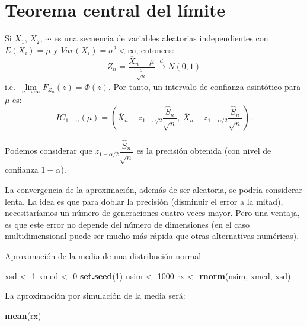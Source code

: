 \documentclass[
]{book}
\newenvironment{Shaded}{\begin{snugshade}}{\end{snugshade}}
\newcommand{\DecValTok}[1]{\textcolor[rgb]{0.00,0.00,0.81}{#1}}
\newcommand{\KeywordTok}[1]{\textcolor[rgb]{0.13,0.29,0.53}{\textbf{#1}}}
\newcommand{\NormalTok}[1]{#1}
\newcommand{\StringTok}[1]{\textcolor[rgb]{0.31,0.60,0.02}{#1}}
\theoremstyle{break}
\theoremstyle{definition}
\theoremstyle{definition}
\theoremstyle{definition}
\theoremstyle{remark}
\let\BeginKnitrBlock\begin \let\EndKnitrBlock\end
\begin{document}
\hypertarget{teorema-central-del-luxedmite}{%
\section{Teorema central del límite}\label{teorema-central-del-luxedmite}}

Si \(X_{1}\), \(X_{2}\), \(\cdots\) es una secuencia de variables aleatorias
independientes con \(E\left( X_{i}\right) =\mu\) y
\(Var\left( X_{i}\right) = \sigma ^{2}<\infty\), entonces:
\[Z_{n}=\frac{\overline{X}_{n}-\mu }{\frac{\sigma }{\sqrt{n}}}
\overset{d}{ \rightarrow } N(0,1)\]
i.e.~\(\lim\limits_{n\rightarrow \infty }F_{Z_{n}}(z)=\Phi (z)\).
Por tanto, un intervalo de confianza asintótico para \(\mu\) es:
\[IC_{1-\alpha }(\mu ) = \left( \overline{X}_{n}
- z_{1-\alpha /2}\dfrac{\widehat{S}_{n}}{\sqrt{n}},\ 
\overline{X}_n+z_{1-\alpha /2}\dfrac{\widehat{S}_{n}}{\sqrt{n}} \right).\]

Podemos considerar que
\(z_{1-\alpha /2}\dfrac{\widehat{S}_{n}}{\sqrt{n}}\)
es la precisión obtenida (con nivel de confianza \(1-\alpha\)).

La convergencia de la aproximación, además de ser aleatoria, se podría considerar lenta.
La idea es que para doblar la precisión (disminuir el error a la mitad), necesitaríamos un número de generaciones cuatro veces mayor. Pero una ventaja, es que este error no depende del número de dimensiones (en el caso multidimensional puede ser mucho más rápida que otras alternativas numéricas).

\BeginKnitrBlock{example}
\protect\hypertarget{exm:unnamed-chunk-5}{}{\label{exm:unnamed-chunk-5} }Aproximación de la media de una distribución normal
\EndKnitrBlock{example}

\begin{Shaded}
\begin{Highlighting}[]
\NormalTok{xsd <-}\StringTok{ }\DecValTok{1}
\NormalTok{xmed <-}\StringTok{ }\DecValTok{0}
\KeywordTok{set.seed}\NormalTok{(}\DecValTok{1}\NormalTok{)}
\NormalTok{nsim <-}\StringTok{ }\DecValTok{1000}
\NormalTok{rx <-}\StringTok{ }\KeywordTok{rnorm}\NormalTok{(nsim, xmed, xsd)}
\end{Highlighting}
\end{Shaded}

La aproximación por simulación de la media será:

\begin{Shaded}
\begin{Highlighting}[]
\KeywordTok{mean}\NormalTok{(rx)}
\end{Highlighting}
\end{Shaded}
\end{document}
